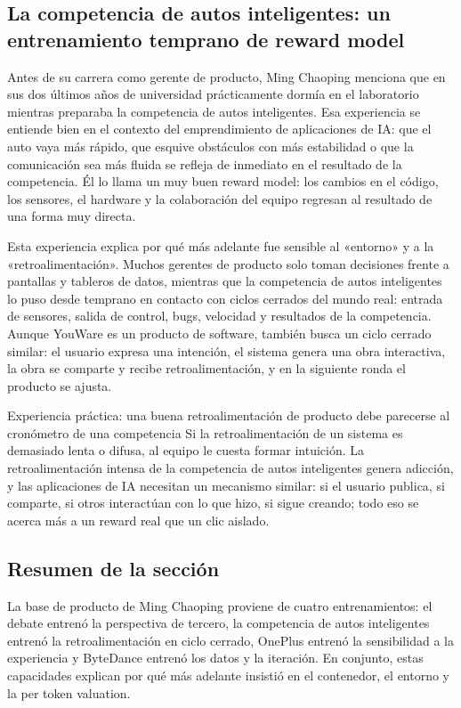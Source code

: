 \documentclass[a4paper]{article}
\begin{document}
\subsection{La competencia de autos inteligentes: un entrenamiento temprano de reward model}

Antes de su carrera como gerente de producto, Ming Chaoping menciona que en sus dos últimos años de universidad prácticamente dormía en el laboratorio mientras preparaba la competencia de autos inteligentes. Esa experiencia se entiende bien en el contexto del emprendimiento de aplicaciones de IA: que el auto vaya más rápido, que esquive obstáculos con más estabilidad o que la comunicación sea más fluida se refleja de inmediato en el resultado de la competencia. Él lo llama un muy buen reward model: los cambios en el código, los sensores, el hardware y la colaboración del equipo regresan al resultado de una forma muy directa.

Esta experiencia explica por qué más adelante fue sensible al «entorno» y a la «retroalimentación». Muchos gerentes de producto solo toman decisiones frente a pantallas y tableros de datos, mientras que la competencia de autos inteligentes lo puso desde temprano en contacto con ciclos cerrados del mundo real: entrada de sensores, salida de control, bugs, velocidad y resultados de la competencia. Aunque YouWare es un producto de software, también busca un ciclo cerrado similar: el usuario expresa una intención, el sistema genera una obra interactiva, la obra se comparte y recibe retroalimentación, y en la siguiente ronda el producto se ajusta.

\begin{importantbox}{Experiencia práctica: una buena retroalimentación de producto debe parecerse al cronómetro de una competencia}
Si la retroalimentación de un sistema es demasiado lenta o difusa, al equipo le cuesta formar intuición. La retroalimentación intensa de la competencia de autos inteligentes genera adicción, y las aplicaciones de IA necesitan un mecanismo similar: si el usuario publica, si comparte, si otros interactúan con lo que hizo, si sigue creando; todo eso se acerca más a un reward real que un clic aislado.
\end{importantbox}

\subsection{Resumen de la sección}

La base de producto de Ming Chaoping proviene de cuatro entrenamientos: el debate entrenó la perspectiva de tercero, la competencia de autos inteligentes entrenó la retroalimentación en ciclo cerrado, OnePlus entrenó la sensibilidad a la experiencia y ByteDance entrenó los datos y la iteración. En conjunto, estas capacidades explican por qué más adelante insistió en el contenedor, el entorno y la per token valuation.
\end{document}
